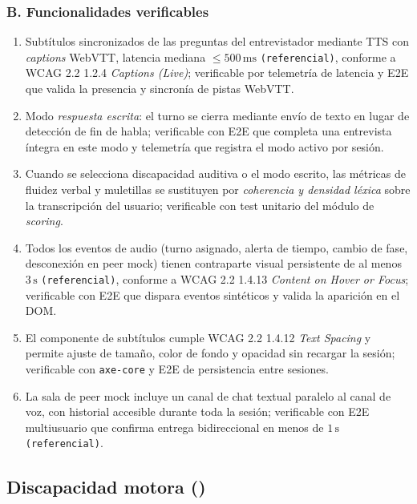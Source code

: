 \subsubsection*{B. Funcionalidades verificables}
\begin{enumerate}
  \item Subtítulos sincronizados de las preguntas del entrevistador
        mediante TTS con \textit{captions} WebVTT, latencia mediana
        $\le 500\,\mathrm{ms}$ \texttt{(referencial)}, conforme a
        WCAG 2.2 1.2.4 \textit{Captions (Live)}; verificable por
        telemetría de latencia y E2E que valida la presencia y
        sincronía de pistas WebVTT.
  \item Modo \emph{respuesta escrita}: el turno se cierra mediante
        envío de texto en lugar de detección de fin de habla;
        verificable con E2E que completa una entrevista íntegra en
        este modo y telemetría que registra el modo activo por sesión.
  \item Cuando se selecciona discapacidad auditiva o el modo escrito,
        las métricas de fluidez verbal y muletillas se sustituyen por
        \emph{coherencia y densidad léxica} sobre la transcripción del
        usuario; verificable con test unitario del módulo de
        \textit{scoring}.
  \item Todos los eventos de audio (turno asignado, alerta de tiempo,
        cambio de fase, desconexión en peer mock) tienen contraparte
        visual persistente de al menos $3\,\mathrm{s}$
        \texttt{(referencial)}, conforme a WCAG 2.2 1.4.13
        \textit{Content on Hover or Focus}; verificable con E2E que
        dispara eventos sintéticos y valida la aparición en el DOM.
  \item El componente de subtítulos cumple WCAG 2.2 1.4.12
        \textit{Text Spacing} y permite ajuste de tamaño, color de
        fondo y opacidad sin recargar la sesión; verificable con
        \texttt{axe-core} y E2E de persistencia entre sesiones.
  \item La sala de peer mock incluye un canal de chat textual paralelo
        al canal de voz, con historial accesible durante toda la
        sesión; verificable con E2E multiusuario que confirma entrega
        bidireccional en menos de $1\,\mathrm{s}$ \texttt{(referencial)}.
\end{enumerate}

\subsection{Discapacidad motora ()}

